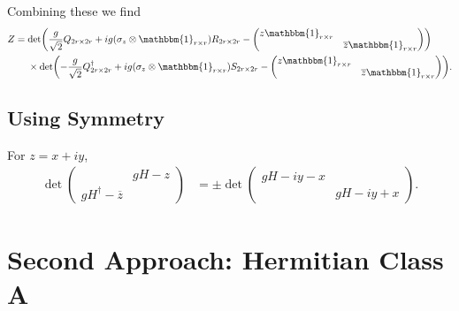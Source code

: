 \documentclass{article}
\begin{document}
Combining these we find
\begin{align}
    Z &= \det(\frac{g}{\sqrt{2}}Q_{2r\times 2r} + ig(\sigma_z \otimes \mathbbm{1}_{r\times r}) R_{2r\times 2r} - \begin{pmatrix}
        z \mathbbm{1}_{r\times r} & \\
        & \overline{z}  \mathbbm{1}_{r\times r}
    \end{pmatrix}) \\
    &{\phantom{{}={}}} \times \det(-\frac{g}{\sqrt{2}}Q^\dagger_{2r\times 2r} + ig(\sigma_z \otimes \mathbbm{1}_{r\times r}) S_{2r\times 2r} - \begin{pmatrix}
        z  \mathbbm{1}_{r\times r} & \\
        & \overline{z}  \mathbbm{1}_{r\times r}
    \end{pmatrix}).
\end{align}

\subsection{Using Symmetry}

For $z = x+iy$,
\begin{align}
    \det \begin{pmatrix}
        & gH-z \\
        gH^\dagger - \overline{z}
    \end{pmatrix} &= \pm \det \begin{pmatrix}
        gH - iy - x & \\ & gH - iy + x
    \end{pmatrix}. \label{eq:symm_appr}
\end{align}

\section{Second Approach: Hermitian Class A}
\end{document}
